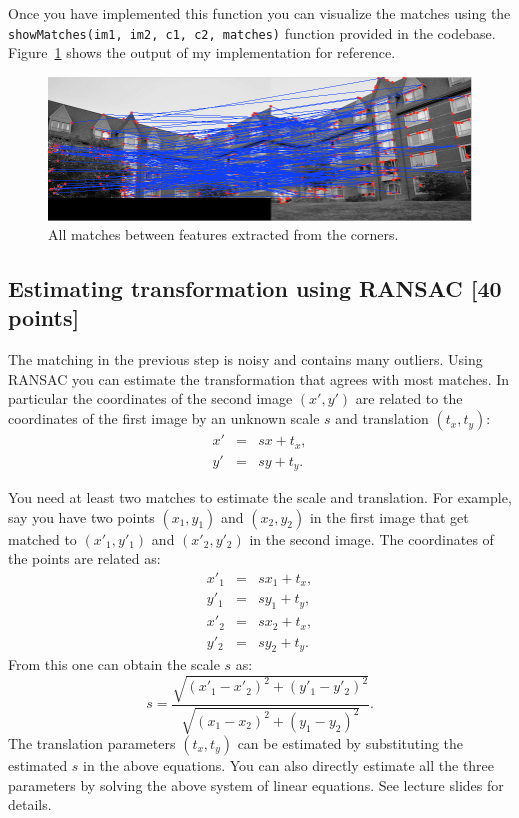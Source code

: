 \documentclass[10pt,letterpaper]{article}
\newcommand{\cmd}[1] {{\color{blue}\texttt{#1}}}
\begin{document}
Once you have implemented this function you can visualize the matches using the \cmd{showMatches(im1, im2, c1, c2, matches)} function provided in the codebase. Figure~\ref{fig:all} shows the output of my implementation for reference.
\begin{figure}[h]
\centering
\includegraphics[width=0.9\linewidth]{allmatches.png}
\caption{\label{fig:all}All matches between features extracted from the corners.}
\end{figure}

\subsection{Estimating transformation using RANSAC [40 points]}
The matching in the previous step is noisy and contains many outliers. 
Using RANSAC you can estimate the transformation that agrees with most matches. In particular the coordinates of the second image $(x', y')$ are related to the coordinates of the first image by an unknown scale $s$ and translation $(t_x,t_y)$:
\begin{eqnarray}
x' &=& sx + t_x, \\
y' &=& sy + t_y.
\end{eqnarray}

You need at least two matches to estimate the scale and translation. For example, say you have two points $(x_1, y_1)$ and $(x_2, y_2)$ in the first image that get matched to $(x'_1, y'_1)$ and $(x'_2, y'_2)$ in the second image. The coordinates of the points are related as:
\begin{eqnarray}
x'_1 &=& sx_1 + t_x,\\
y'_1 &=& sy_1 + t_y, \\
x'_2 &=& sx_2 + t_x,\\
y'_2 &=& sy_2 + t_y.
\end{eqnarray}
From this one can obtain the scale $s$ as:
\begin{equation}
s = \frac{\sqrt{(x'_1-x'_2)^2 + (y'_1-y'_2)^2}}{\sqrt{(x_1-x_2)^2 + (y_1-y_2)^2}}.
\end{equation}
The translation parameters $(t_x,t_y)$ can be estimated by substituting the estimated $s$ in the above equations. 
You can also directly estimate all the three parameters by solving the above system of linear equations. See lecture slides for details.
\end{document}
